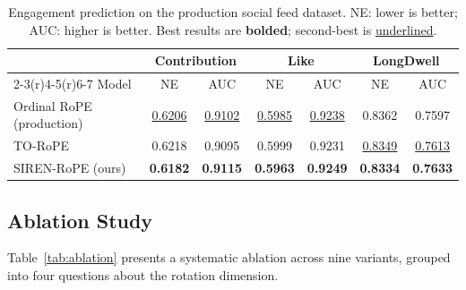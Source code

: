 \documentclass{article}
\begin{document}
\begin{table}[t]
  \caption{Engagement prediction on the production social feed dataset.
    NE: lower is better; AUC: higher is better. Best results are
    \textbf{bolded}; second-best is \underline{underlined}.}
  \label{tab:main}
  \centering
  \small
  \begin{tabular}{lcccccc}
    \toprule
    & \multicolumn{2}{c}{Contribution} & \multicolumn{2}{c}{Like}
    & \multicolumn{2}{c}{LongDwell} \\
    \cmidrule(r){2-3}\cmidrule(r){4-5}\cmidrule(r){6-7}
    Model & NE & AUC & NE & AUC & NE & AUC \\
    \midrule
    Ordinal RoPE (production) & \underline{0.6206} & \underline{0.9102} & \underline{0.5985} & \underline{0.9238} & 0.8362 & 0.7597 \\
    TO-RoPE                   & 0.6218 & 0.9095 & 0.5999 & 0.9231 & \underline{0.8349} & \underline{0.7613} \\
    \midrule
    SIREN-RoPE (ours)         & \textbf{0.6182} & \textbf{0.9115} & \textbf{0.5963} & \textbf{0.9249} & \textbf{0.8334} & \textbf{0.7633} \\
    \bottomrule
  \end{tabular}
\end{table}

\subsection{Ablation Study}

Table~\ref{tab:ablation} presents a systematic ablation across nine variants,
grouped into four questions about the rotation dimension.
\end{document}
